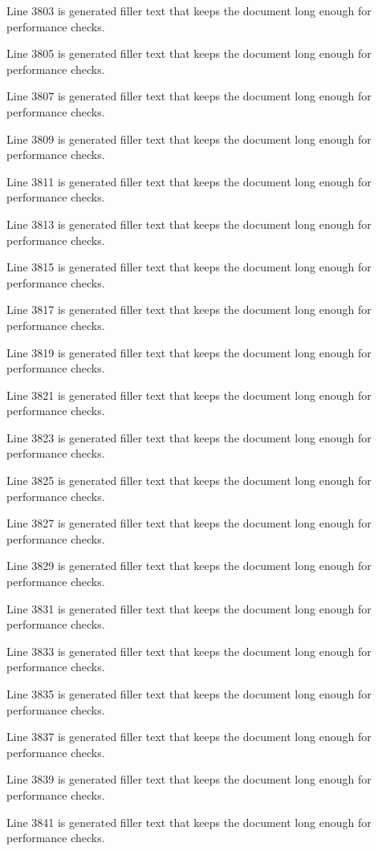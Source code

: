 Line 3803 is generated filler text that keeps the document long enough for performance checks.

Line 3805 is generated filler text that keeps the document long enough for performance checks.

Line 3807 is generated filler text that keeps the document long enough for performance checks.

Line 3809 is generated filler text that keeps the document long enough for performance checks.

Line 3811 is generated filler text that keeps the document long enough for performance checks.

Line 3813 is generated filler text that keeps the document long enough for performance checks.

Line 3815 is generated filler text that keeps the document long enough for performance checks.

Line 3817 is generated filler text that keeps the document long enough for performance checks.

Line 3819 is generated filler text that keeps the document long enough for performance checks.

Line 3821 is generated filler text that keeps the document long enough for performance checks.

Line 3823 is generated filler text that keeps the document long enough for performance checks.

Line 3825 is generated filler text that keeps the document long enough for performance checks.

Line 3827 is generated filler text that keeps the document long enough for performance checks.

Line 3829 is generated filler text that keeps the document long enough for performance checks.

Line 3831 is generated filler text that keeps the document long enough for performance checks.

Line 3833 is generated filler text that keeps the document long enough for performance checks.

Line 3835 is generated filler text that keeps the document long enough for performance checks.

Line 3837 is generated filler text that keeps the document long enough for performance checks.

Line 3839 is generated filler text that keeps the document long enough for performance checks.

Line 3841 is generated filler text that keeps the document long enough for performance checks.

